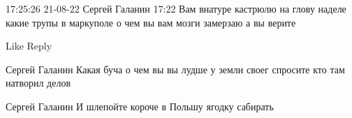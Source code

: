  
 
 
 
 

17:25:26 21-08-22
Сергей Галанин
17:22
Вам внатуре кастрюлю на глову наделе какие трупы в маркуполе о чем вы вам мозги замерзаю а вы верите

    Like
    Reply

Сергей Галанин
Какая буча о чем вы вы лудше у земли своег спросите кто там натворил делов

Сергей Галанин
И шлепойте короче в Польшу ягодку сабирать
